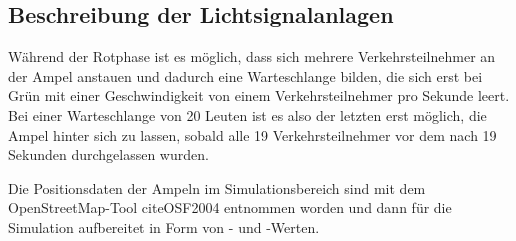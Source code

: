 %

\subsection{Beschreibung der Lichtsignalanlagen}\label{subsec:description}

Während der Rotphase ist es möglich, dass sich mehrere Verkehrsteilnehmer an der Ampel anstauen und dadurch eine Warteschlange bilden, die sich erst bei Grün mit einer Geschwindigkeit von einem Verkehrsteilnehmer pro Sekunde leert.
Bei einer Warteschlange von 20 Leuten ist es also der letzten  erst möglich, die Ampel hinter sich zu lassen, sobald alle 19 Verkehrsteilnehmer vor dem  nach 19 Sekunden durchgelassen wurden.

Die Positionsdaten der Ampeln im Simulationsbereich sind mit dem OpenStreetMap-Tool cite{OSF2004} entnommen worden und dann für die Simulation aufbereitet in Form von - und -Werten.
